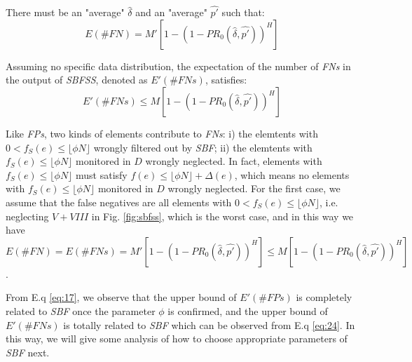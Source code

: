 \documentclass[conference]{IEEEtran}
\begin{document}
\begin{lemma}\label{lem:9}
There must be an "average" $\widehat{\delta}$ and an "average" $\widehat{p'}$ such that: 
\begin{equation}\label{eq:20}
E(\#FN)=M'[1-(1-PR_0(\widehat{\delta},\widehat{p'}))^H]
\end{equation}
\end{lemma}

\begin{theorem}\label{thm:7}
	Assuming no specific data distribution, the expectation of the number of \emph{FNs} in the output of \emph{SBFSS}, denoted as $E'(\#FNs)$, satisfies:
	\begin{equation}\label{eq:24}
	E'(\#FNs)\leq M[1-(1-PR_0(\widehat{\delta},\widehat{p'}))^H]
	\end{equation}
\end{theorem}

\begin{IEEEproof}
Like \emph{FPs}, two kinds of elements contribute to \emph{FNs}: i) the elemtents with $0<f_S(e)\leq\lfloor \phi N\rfloor$ wrongly filtered out by \emph{SBF}; ii) the elemtents with $f_S(e)\leq\lfloor \phi N\rfloor$ monitored in $D$ wrongly neglected. In fact, elements with $f_S(e)\leq\lfloor \phi N\rfloor$ must satisfy $f(e)\leq\lfloor \phi N\rfloor+\Delta(e)$, which means no elements with $f_S(e)\leq\lfloor \phi N\rfloor$ monitored in $D$ wrongly neglected. For the first case, we assume that the false negatives are all elements with $0<f_S(e)\leq\lfloor \phi N\rfloor$, i.e. neglecting $V+VIII$ in Fig. \ref{fig:sbfss}, which is the worst case, and in this way we have $E(\#FN)=E(\#FNs)=M'[1-(1-PR_0(\widehat{\delta},\widehat{p'}))^H]\leq M[1-(1-PR_0(\widehat{\delta},\widehat{p'}))^H]$.
\end{IEEEproof}
From E.q \ref{eq:17}, we observe that the upper bound of $E'(\#FPs)$ is completely related to \emph{SBF} once the parameter $\phi$ is confirmed, and the upper bound of $E'(\#FNs)$ is totally related to \emph{SBF} which can be observed from E.q \ref{eq:24}. In this way, we will give some analysis of how to choose appropriate parameters of \emph{SBF} next.
\end{document}
